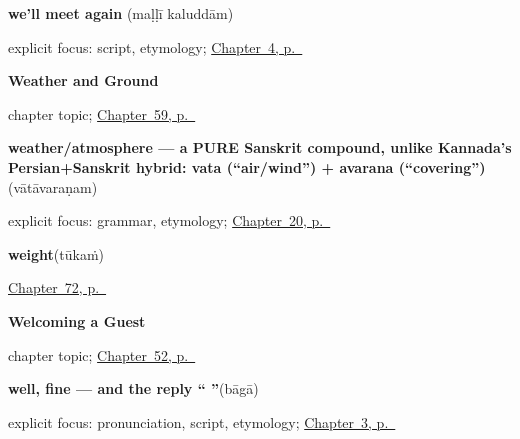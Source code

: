 \noindent\begin{minipage}[t]{\linewidth}
\raggedright
\textbf{we'll meet again}\enspace\emph{ }\enspace(maḷḷī kaluddām)\par
\footnotesize explicit focus: script, etymology; \hyperref[ch:farewells]{Chapter~4, p.~\pageref*{ch:farewells}}
\end{minipage}\par\smallskip

\noindent\begin{minipage}[t]{\linewidth}
\raggedright
\textbf{Weather and Ground}\par
\footnotesize chapter topic; \hyperref[ch:te-weather-ground]{Chapter~59, p.~\pageref*{ch:te-weather-ground}}
\end{minipage}\par\smallskip

\noindent\begin{minipage}[t]{\linewidth}
\raggedright
\textbf{weather/atmosphere — a PURE Sanskrit compound, unlike Kannada's Persian+Sanskrit hybrid: vata (\textquotedblleft{}air/wind\textquotedblright{}) + avarana (\textquotedblleft{}covering\textquotedblright{})}\enspace\emph{}\enspace(vātāvaraṇam)\par
\footnotesize explicit focus: grammar, etymology; \hyperref[ch:te-numbers-and-weather]{Chapter~20, p.~\pageref*{ch:te-numbers-and-weather}}
\end{minipage}\par\smallskip

\noindent\begin{minipage}[t]{\linewidth}
\raggedright
\textbf{weight}\enspace\emph{}\enspace(tūkaṁ)\par
\footnotesize \hyperref[ch:te-the-market]{Chapter~72, p.~\pageref*{ch:te-the-market}}
\end{minipage}\par\smallskip

\noindent\begin{minipage}[t]{\linewidth}
\raggedright
\textbf{Welcoming a Guest}\par
\footnotesize chapter topic; \hyperref[ch:te-welcome]{Chapter~52, p.~\pageref*{ch:te-welcome}}
\end{minipage}\par\smallskip

\noindent\begin{minipage}[t]{\linewidth}
\raggedright
\textbf{well, fine — and the reply \textquotedblleft{} \textquotedblright{}}\enspace\emph{}\enspace(bāgā)\par
\footnotesize explicit focus: pronunciation, script, etymology; \hyperref[ch:responding]{Chapter~3, p.~\pageref*{ch:responding}}
\end{minipage}\par\smallskip

